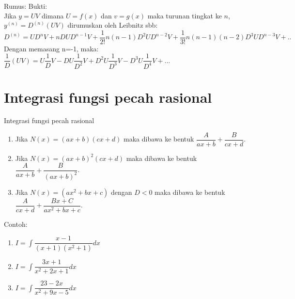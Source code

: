 \documentclass{beamer}
\begin{document}
\begin{frame}[t, fragile]{Rumus: }
Bukti:\\
Jika $y = UV$ dimana $U=f(x)$ dan $v=g(x)$ maka turunan tingkat ke $n$,\\
$y^{(n)} = D^{(n)} (UV)$ dirumuskan oleh Leibnitz sbb:
$D^{(n)} = UD^nV + nDUD^{n-1}V+\dfrac{1}{2!} n(n-1)D^2UD^{n-2}V+\dfrac{1}{3!} n(n-1)(n-2)D^3UD^{n-3}V+..$\\
\vskip10pt
Dengan memasang n=-1, maka: \\
$\dfrac{1}{D}(UV)=U\dfrac{1}{D}V-DU\dfrac{1}{D^2}V+D^2U\dfrac{1}{D^3}V-D^3U\dfrac{1}{D^4}V+...$

\end{frame}


\section{Integrasi fungsi pecah rasional}
\begin{frame}[t, fragile]{Integrasi fungsi pecah rasional}
\begin{enumerate}
\item Jika $N(x) = (ax + b)(cx + d)$ maka dibawa ke bentuk $\dfrac{A}{ax+b} + \dfrac{B}{cx+d}$. 
\item Jika $N(x) = (ax+b)^2(cx+d)$ maka dibawa ke bentuk $\dfrac{A}{ax+b} + \dfrac{B}{(ax+b)^2}$. 
\item Jika $N(x) = (ax^2+bx+c)$ dengan $D<0$ maka dibawa ke bentuk $\dfrac{A}{cx+d} + \dfrac{Bx+C}{ax^2+bx+c}$.
\end{enumerate}
\begin{block}{Contoh:}
\begin{enumerate}
\item $I=\int \dfrac{x-1}{(x+1)(x^2+1)}dx$
\item $I=\int \dfrac{3x+1}{x^2+2x+1}dx$
\item $I=\int \dfrac{23-2x}{x^2+9x-5}dx$
\end{enumerate}
\end{block}
\end{frame}
\end{document}
